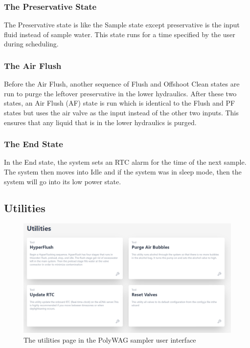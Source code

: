 \documentclass[11pt, letterpaper]{article}
\begin{document}
\subsubsection{The Preservative State} 
The Preservative state is like the Sample state except preservative is the input fluid instead of sample water. This state runs for a time specified by the user during scheduling.

\subsubsection{The Air Flush}
Before the Air Flush, another sequence of Flush and Offshoot Clean states are run to purge the leftover preservative in the lower hydraulics. After these two states, an Air Flush (AF) state is run which is identical to the Flush and PF states but uses the air valve as the input instead of the other two inputs. This ensures that any liquid that is in the lower hydraulics is purged. 

\subsubsection{The End State}
In the End state, the system sets an RTC alarm for the time of the next sample. The system then moves into Idle and if the system was in sleep mode, then the system will go into its low power state.

\subsection{Utilities}
\label{subsec:Util}
\begin{figure}[H]
	\centering
	\includegraphics[scale=0.5]{./Assets/Utilities.png}
	\caption{The utilities page in the PolyWAG sampler user interface}
\end{figure}
\end{document}
